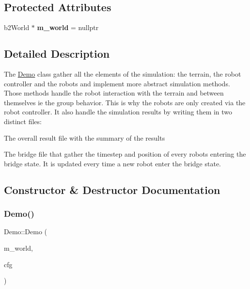 \subsection*{Protected Attributes}
\begin{DoxyCompactItemize}
\item 
\mbox{\label{class_demo_ab996202da88e954f84e9ce3a9d467065}} 
b2\+World $\ast$ {\bfseries m\+\_\+world} = nullptr
\end{DoxyCompactItemize}


\subsection{Detailed Description}
The \mbox{\hyperlink{class_demo}{Demo}} class gather all the elements of the simulation\+: the terrain, the robot controller and the robots and implement more abstract simulation methods. Those methods handle the robot interaction with the terrain and between themselves ie the group behavior. This is why the robots are only created via the robot controller. It also handle the simulation results by writing them in two distinct files\+:
\begin{DoxyItemize}
\item The overall result file with the summary of the results
\item The bridge file that gather the timestep and position of every robots entering the bridge state. It is updated every time a new robot enter the bridge state. 
\end{DoxyItemize}

\subsection{Constructor \& Destructor Documentation}
\mbox{\label{class_demo_a7fa722430ba973c538ae230e407854ab}} 
\subsubsection{\texorpdfstring{Demo()}{Demo()}}
{\footnotesize\ttfamily Demo\+::\+Demo (\begin{DoxyParamCaption}\item[{b2\+World $\ast$}]{m\+\_\+world,  }\item[{\mbox{\hyperlink{structconfig_1_1s_config}{config\+::s\+Config}}}]{cfg }\end{DoxyParamCaption})}

